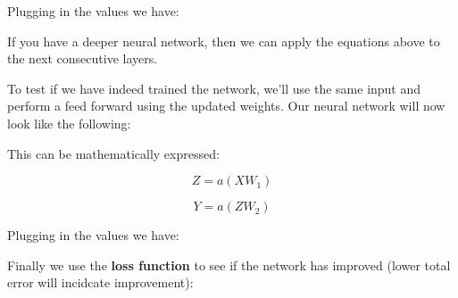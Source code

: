 \documentclass[a4paper]{article}
\begin{document}
Plugging in the values we have:

If you have a deeper neural network, then we can apply the equations above to the next consecutive layers.

To test if we have indeed trained the network, we'll use the same input and perform a feed forward using the updated weights. Our neural network will now look like the following:

This can be mathematically expressed:

\begin{equation}
  Z=a(XW_{1})
\end{equation}

\begin{equation}
  Y=a(ZW_{2})
\end{equation}

Plugging in the values we have:

Finally we use the \textbf{loss function} to see if the network has improved (lower total error will incidcate improvement):
\end{document}
